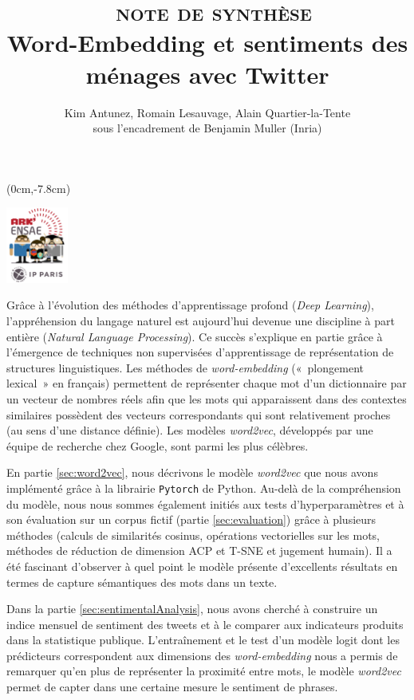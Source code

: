 \documentclass[10pt,french,french]{article}
\title{~\textsc{note de synthèse}\\
\hspace*{0.333em}Word-Embedding et sentiments des ménages avec Twitter}
\author{Kim Antunez, Romain Lesauvage, Alain Quartier-la-Tente\\
sous l'encadrement de Benjamin Muller (Inria)}
\date{}
\begin{document}
\maketitle


\begin{textblock*}{\textwidth}(0cm,-7.8cm)
\begin{center}
\includegraphics[height=2.5cm]{img/LOGO-ENSAE.png}
\end{center}
\end{textblock*}

Grâce à l'évolution des méthodes d'apprentissage profond (\emph{Deep Learning}), l'appréhension du langage naturel est aujourd'hui devenue une discipline à part entière (\emph{Natural Language Processing}).
Ce succès s'explique en partie grâce à l'émergence de techniques non supervisées d'apprentissage de représentation de structures linguistiques.
Les méthodes de \emph{word-embedding} («~plongement lexical~» en français) permettent de représenter chaque mot d'un dictionnaire par un vecteur de nombres réels afin que les mots qui apparaissent dans des contextes similaires possèdent des vecteurs correspondants qui sont relativement proches (au sens d'une distance définie).
Les modèles \emph{word2vec}, développés par une équipe de recherche chez Google, sont parmi les plus célèbres.

En partie \ref{sec:word2vec}, nous décrivons le modèle \emph{word2vec} que nous avons implémenté grâce à la librairie \texttt{Pytorch} de Python.
Au-delà de la compréhension du modèle, nous nous sommes également initiés aux tests d'hyperparamètres et à son évaluation sur un corpus fictif (partie \ref{sec:evaluation}) grâce à plusieurs méthodes (calculs de similarités cosinus, opérations vectorielles sur les mots, méthodes de réduction de dimension ACP et T-SNE et jugement humain).
Il a été fascinant d'observer à quel point le modèle présente d'excellents résultats en termes de capture sémantiques des mots dans un texte.

Dans la partie \ref{sec:sentimentalAnalysis}, nous avons cherché à construire un indice mensuel de sentiment des tweets et à le comparer aux indicateurs produits dans la statistique publique.
L'entraînement et le test d'un modèle logit dont les prédicteurs correspondent aux dimensions des \emph{word-embedding} nous a permis de remarquer qu'en plus de représenter la proximité entre mots, le modèle \emph{word2vec} permet de capter dans une certaine mesure le sentiment de phrases.
\end{document}

